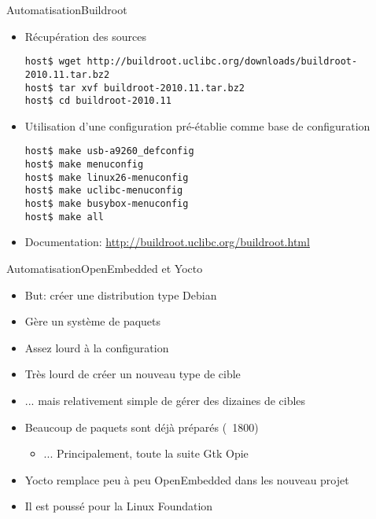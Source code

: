 \begin{frame}[fragile=singleslide]{Automatisation}{Buildroot}
  \begin{itemize}
  \item Récupération des sources
    \begin{lstlisting}
host$ wget http://buildroot.uclibc.org/downloads/buildroot-2010.11.tar.bz2
host$ tar xvf buildroot-2010.11.tar.bz2
host$ cd buildroot-2010.11
    \end{lstlisting} 
  \item  Utilisation  d'une configuration  pré-établie  comme base  de
    configuration
    \begin{lstlisting}
host$ make usb-a9260_defconfig
host$ make menuconfig
host$ make linux26-menuconfig
host$ make uclibc-menuconfig
host$ make busybox-menuconfig
host$ make all
    \end{lstlisting}
  \item Documentation: \url{http://buildroot.uclibc.org/buildroot.html}
  \end{itemize}
\end{frame}

\begin{frame}[fragile=singleslide]{Automatisation}{OpenEmbedded et Yocto}
  \begin{itemize}
  \item But: créer une distribution type Debian
  \item Gère un système de paquets
  \item Assez lourd à la configuration
  \item Très lourd de créer un nouveau type de cible
  \item ... mais relativement simple de gérer des dizaines de cibles
  \item Beaucoup de paquets sont déjà préparés (~1800)
    \begin{itemize}
    \item ... Principalement, toute la suite Gtk Opie
    \end{itemize}
  \item Yocto remplace peu à peu OpenEmbedded dans les nouveau projet
  \item Il est poussé pour la Linux Foundation

  \end{itemize}
\end{frame}

